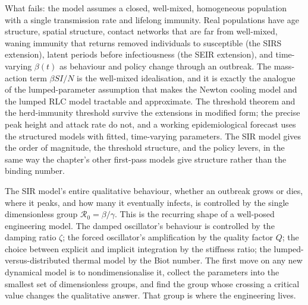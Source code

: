 What fails: the model assumes a closed, well-mixed, homogeneous
population with a single transmission rate and lifelong immunity. Real
populations have age structure, spatial structure, contact networks
that are far from well-mixed, waning immunity that returns removed
individuals to susceptible (the SIRS extension), latent periods before
infectiousness (the SEIR extension), and time-varying $\beta(t)$ as
behaviour and policy change through an outbreak. The mass-action term
$\beta S I/N$ is the well-mixed idealisation, and it is exactly the
analogue of the lumped-parameter assumption that makes the Newton
cooling model and the lumped RLC model tractable and approximate. The
threshold theorem and the herd-immunity threshold survive the
extensions in modified form; the precise peak height and attack rate
do not, and a working epidemiological forecast uses the structured
models with fitted, time-varying parameters. The SIR model gives the
order of magnitude, the threshold structure, and the policy levers, in
the same way the chapter's other first-pass models give structure
rather than the binding number.

\begin{principle}
The SIR model's entire qualitative behaviour, whether an outbreak
grows or dies, where it peaks, and how many it eventually infects, is
controlled by the single dimensionless group $\mathcal{R}_{0} =
\beta/\gamma$. This is the recurring shape of a well-posed engineering
model. The damped oscillator's behaviour is controlled by the damping
ratio $\zeta$; the forced oscillator's amplification by the quality
factor $Q$; the choice between explicit and implicit integration by
the stiffness ratio; the lumped-versus-distributed thermal model by
the Biot number. The first move on any new dynamical model is to
nondimensionalise it, collect the parameters into the smallest set of
dimensionless groups, and find the group whose crossing a critical
value changes the qualitative answer. That group is where the
engineering lives.
\end{principle}

